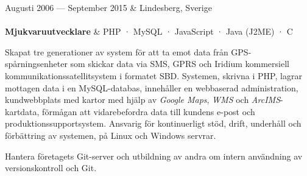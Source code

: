 \documentclass{cv-stylish}
\begin{document}
\begin{center}
\vspace{1em}
\begin{JobTable}
  Augusti 2006 --- September 2015 & \hfill Lindesberg, Sverige \\[3pt]
   \\[3pt]
  \hspace{5mm} \textbf{Mjukvaruutvecklare}
  & \hfill PHP · MySQL · JavaScript · Java (J2ME) · C \\
\end{JobTable}
\begin{adjustwidth}{0.015\linewidth}{0.015\linewidth}
\begin{compactitem}
  \item Skapat tre generationer av system för att ta emot data från
    GPS-spårningsenheter som skickar data via SMS, GPRS och Iridium
    kommersiell kommunikationssatellitsystem i formatet SBD.
    Systemen, skrivna i PHP, lagrar mottagen data i en MySQL-databas, innehåller en webbaserad administration, kundwebbplats
    med kartor med hjälp av \emph{Google Maps}, \emph{WMS} och \emph{ArcIMS}-kartdata, förmågan att vidarebefordra
    data till kundens e-post och produktionssupportsystem. Ansvarig för kontinuerligt stöd,
    drift, underhåll och förbättring av systemen, på Linux och Windows
    servrar.
  \item Hantera företagets Git-server och utbildning av andra om
    intern användning av versionskontroll och Git.
\end{compactitem}
\end{adjustwidth}



\end{center}
\end{document}
